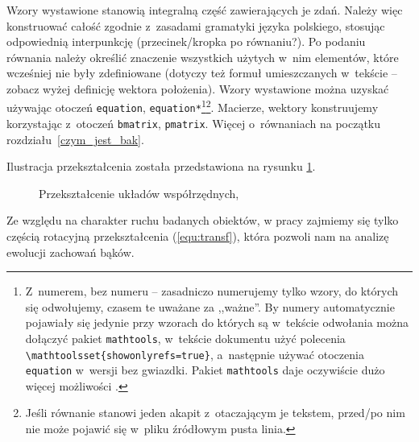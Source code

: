 {\red
  Wzory wystawione stanowią integralną część zawierających je zdań. Należy więc konstruować całość zgodnie z~zasadami gramatyki języka polskiego, stosując odpowiednią interpunkcję (przecinek/kropka po równaniu?). Po podaniu równania należy określić znaczenie wszystkich użytych w~nim elementów, które wcześniej nie były zdefiniowane (dotyczy też formuł umieszczanych w~tekście -- zobacz wyżej definicję wektora położenia). Wzory wystawione można uzyskać używając otoczeń \texttt{equation}, \texttt{equation*}\footnote{\red Z~numerem, bez numeru -- zasadniczo numerujemy tylko wzory, do których się odwołujemy, czasem te uważane za ,,ważne''. By numery automatycznie pojawiały się jedynie przy wzorach do których są w~tekście odwołania można dołączyć pakiet \texttt{mathtools}, w~tekście dokumentu użyć polecenia \texttt{\textbackslash mathtoolsset\{showonlyrefs=true\}}, a~następnie używać otoczenia \texttt{equation} w~wersji bez gwiazdki. Pakiet \texttt{mathtools} daje oczywiście dużo więcej możliwości \cite{mathtools}.}\footnote{\red  Jeśli równanie stanowi jeden akapit z~otaczającym je tekstem, przed/po nim nie może pojawić się w~pliku źródłowym pusta linia.}. Macierze, wektory konstruujemy korzystając z~otoczeń \texttt{bmatrix}, \texttt{pmatrix}. Więcej o~równaniach na początku rozdziału~\ref{czym_jest_bak}.}

\noindent
[\ldots] Ilustracja przekształcenia została przedstawiona na rysunku \ref{fig:transf_se3}.
\begin{figure} [tp]
  \centering%
  \caption{Przekształcenie układów współrzędnych, \cite{TchMu18}}
  \label{fig:transf_se3}
\end{figure}
%   
Ze względu na charakter ruchu badanych obiektów, w pracy zajmiemy się tylko częścią rotacyjną przekształcenia (\ref{equ:transf}), która pozwoli nam na analizę ewolucji zachowań bąków.

